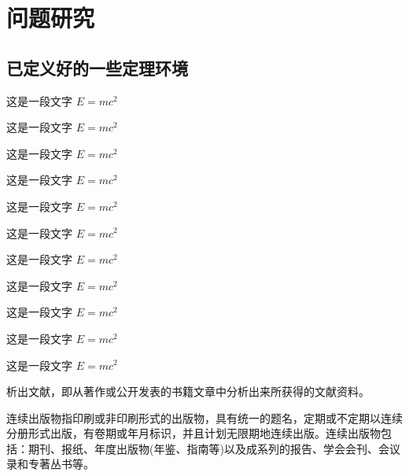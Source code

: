 \chapter{问题研究}


\section{已定义好的一些定理环境}


\begin{definition}
  这是一段文字 $E = m c^2$
\end{definition}

\begin{theorem}
  这是一段文字 $E = m c^2$
\end{theorem}

\begin{example}
  这是一段文字 $E = m c^2$
\end{example}

\begin{property}
  这是一段文字 $E = m c^2$
\end{property}

\begin{proposition}
  这是一段文字 $E = m c^2$
\end{proposition}

\begin{corollary}
  这是一段文字 $E = m c^2$
\end{corollary}

\begin{lemma}
  这是一段文字 $E = m c^2$
\end{lemma}

\begin{axiom}
  这是一段文字 $E = m c^2$
\end{axiom}

\begin{antiexample}
  这是一段文字 $E = m c^2$
\end{antiexample}

\begin{conjecture}
  这是一段文字 $E = m c^2$
\end{conjecture}

\begin{question}
  这是一段文字 $E = m c^2$
\end{question}

析出文献，即从著作或公开发表的书籍文章中分析出来所获得的文献资料。

连续出版物指印刷或非印刷形式的出版物，具有统一的题名，定期或不定期以连续分册形式出版，有卷期或年月标识，并且计划无限期地连续出版。连续出版物包括：期刊、报纸、年度出版物(年鉴、指南等)以及成系列的报告、学会会刊、会议录和专著丛书等。
\parencite{李晓东,Ahn,丁文祥,张启发,雷光春,邱泽奇,zhang,唐绪军,昂温,Foth,杨国枢,Morison,张志祥,Aldemita,张凯军,Kosek,文献编写,国防白皮,federal,health,江向东,萧钮,PACS-L}
